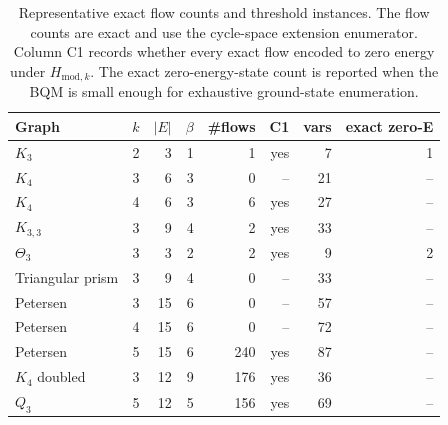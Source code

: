 \begin{table}[t]
\centering
\small
\caption{Representative exact flow counts and threshold instances. The flow counts are exact and use the cycle-space extension enumerator. Column C1 records whether every exact flow encoded to zero energy under $H_{\mathrm{mod},k}$. The exact zero-energy-state count is reported when the BQM is small enough for exhaustive ground-state enumeration.}
\label{tab:theorem-representative}
\begin{tabular}{lrrrrrrr}
\hline
Graph & $k$ & $|E|$ & $\beta$ & \#flows & C1 & vars & exact zero-E \\
\hline
$K_3$ & 2 & 3 & 1 & 1 & yes & 7 & 1 \\
$K_4$ & 3 & 6 & 3 & 0 & -- & 21 & -- \\
$K_4$ & 4 & 6 & 3 & 6 & yes & 27 & -- \\
$K_{3,3}$ & 3 & 9 & 4 & 2 & yes & 33 & -- \\
$\Theta_3$ & 3 & 3 & 2 & 2 & yes & 9 & 2 \\
Triangular prism & 3 & 9 & 4 & 0 & -- & 33 & -- \\
Petersen & 3 & 15 & 6 & 0 & -- & 57 & -- \\
Petersen & 4 & 15 & 6 & 0 & -- & 72 & -- \\
Petersen & 5 & 15 & 6 & 240 & yes & 87 & -- \\
$K_4$ doubled & 3 & 12 & 9 & 176 & yes & 36 & -- \\
$Q_3$ & 5 & 12 & 5 & 156 & yes & 69 & -- \\
\hline
\end{tabular}
\end{table}
